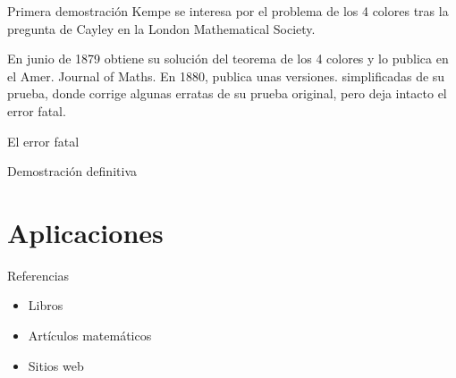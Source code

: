 \documentclass[spanish,utf8]{beamer}
\begin{document}
\begin{frame}{\insertsection}\transblindsvertical
\begin{block}{Primera demostración}
Kempe se interesa por el problema de los 4 colores tras la pregunta de Cayley en la London Mathematical Society.
\end{block}

\begin{block}{}
En junio de 1879 obtiene su solución del teorema de los 4 colores y lo publica en el Amer. Journal of Maths. En 1880, publica unas versiones. simplificadas de su prueba, donde corrige algunas erratas de su prueba original, pero deja intacto el error fatal.
\end{block}
    \end{frame}

\begin{frame}{\insertsection}\transblindsvertical
El error fatal
\end{frame}

\begin{frame}{\insertsection}\transblindsvertical
Demostración definitiva
\end{frame}

\section{Aplicaciones}
\begin{frame}{\insertsection}\transblindsvertical

\end{frame}


\begin{frame}[allowframebreaks]{Referencias}\transblindsvertical
\begin{itemize}
	\item Libros
	\nocite{*}
	\printbibliography[heading=none,keyword=book]
	\item Artículos matemáticos
	\printbibliography[heading=none,keyword=paper]
	\item Sitios web
	\printbibliography[heading=none,keyword=online]
\end{itemize}
\end{frame}
\end{document}
